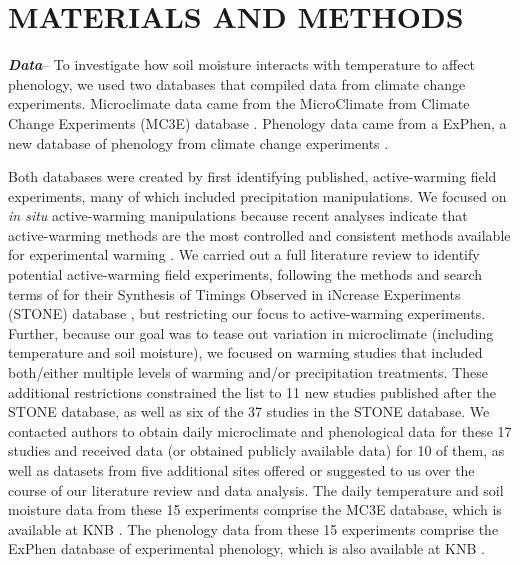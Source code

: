 \documentclass{article}
\begin{document}
\section* {MATERIALS AND METHODS}
\textbf {\emph{Data}}-- To investigate how soil moisture interacts with temperature to affect phenology, we used two databases that compiled data from climate change experiments. Microclimate data came from the  MicroClimate from Climate Change Experiments (MC3E) database \citep{ettinger2018}. Phenology data came from a ExPhen, a new database of phenology from climate change experiments \citep{ettinger2021}. 
\par Both databases were created by first identifying published, active-warming field experiments, many of which included precipitation manipulations. We focused on \textit{in situ} active-warming manipulations because recent analyses indicate that active-warming methods are the most controlled and consistent methods available for experimental warming \citep{kimball2005,kimball2008,aronson2009,wolkovich2012}. We carried out a full literature review to identify potential active-warming field experiments, following the methods and search terms of \citet{wolkovich2012} for their Synthesis of Timings Observed in iNcrease Experiments (STONE) database \citep{wolkovich2012}, but restricting our focus to active-warming experiments. Further, because our goal was to tease out variation in microclimate (including temperature and soil moisture), we focused on warming studies that included both/either multiple levels of warming and/or precipitation treatments. These additional restrictions constrained the list to 11 new studies published after the STONE database, as well as six of the 37 studies in the STONE database. We contacted authors to obtain daily microclimate and phenological data for these 17 studies and received data (or obtained publicly available data) for 10 of them, as well as datasets from five additional sites offered or suggested to us over the course of our literature review and data analysis. The daily temperature and soil moisture data from these 15 experiments comprise the MC3E database, which is available at KNB \citep{ettinger2018}. The phenology data from these 15 experiments comprise the ExPhen database of experimental phenology, which is also available at KNB \citep{ettinger2021}.
\end{document}
